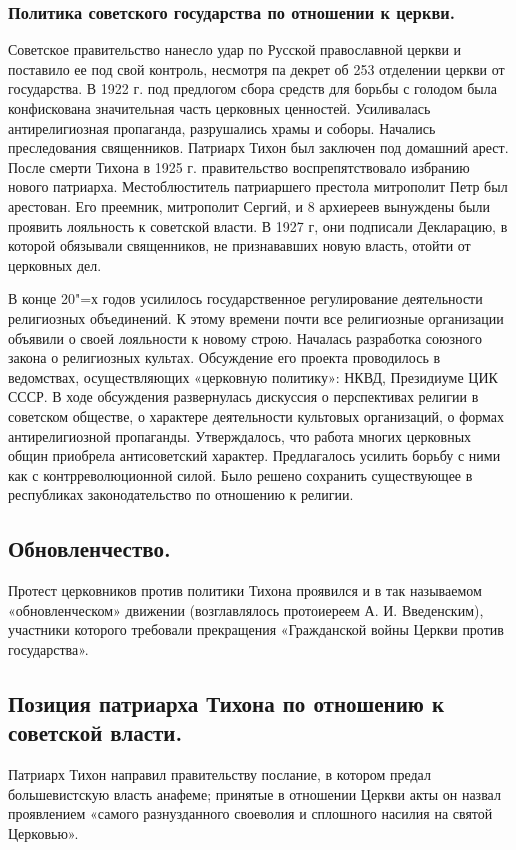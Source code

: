 \subsubsection{\textbf{Политика советского государства по отношении к церкви.}}

Советское правительство нанесло удар по Русской православной церкви и поставило ее под свой контроль, несмотря па декрет об 253 отделении церкви от государства. В 1922 г. под предлогом сбора средств для борьбы с голодом была конфискована значительная часть церковных ценностей. Усиливалась антирелигиозная пропаганда, разрушались храмы и соборы. Начались преследования священников. Патриарх Тихон был заключен под домашний арест. После смерти Тихона в 1925 г. правительство воспрепятствовало избранию нового патриарха. Местоблюститель патриаршего престола митрополит Петр был арестован. Его преемник, митрополит Сергий, и 8 архиереев вынуждены были проявить лояльность к советской власти. В 1927 г, они подписали Декларацию, в которой обязывали священников, не признававших новую власть, отойти от церковных дел.

В конце 20"=х годов усилилось государственное регулирование деятельности религиозных объединений. К этому времени почти все религиозные организации объявили о своей лояльности к новому строю. Началась разработка союзного закона о религиозных культах. Обсуждение его проекта проводилось в ведомствах, осуществляющих «церковную политику»: НКВД, Президиуме ЦИК СССР. В ходе обсуждения развернулась дискуссия о перспективах религии в советском обществе, о характере деятельности культовых организаций, о формах антирелигиозной пропаганды. Утверждалось, что работа многих церковных общин приобрела антисоветский характер. Предлагалось усилить борьбу с ними как с контрреволюционной силой. Было решено сохранить существующее в республиках законодательство по отношению к религии.

\subsection{Обновленчество.}

Протест церковников против политики Тихона проявился и в так называемом «обновленческом» движении (возглавлялось протоиереем А. И. Введенским), участники которого требовали прекращения «Гражданской войны Церкви против государства».

\subsection{Позиция патриарха Тихона по отношению к советской власти.}

Патриарх Тихон направил правительству послание, в котором предал большевистскую власть анафеме; принятые в отношении Церкви акты он назвал проявлением «самого разнузданного своеволия и сплошного насилия на святой Церковью». 

